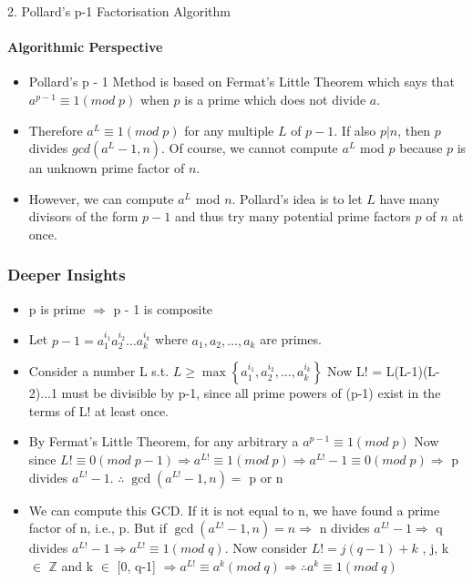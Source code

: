 \documentclass{beamer}
\begin{document}
\begin{frame}{2. Pollard’s p-1 Factorisation Algorithm}
\framesubtitle{Algorithmic Perspective}
\begin{itemize}
    \item Pollard's p - 1 Method is based on Fermat’s Little Theorem
    which says that $a^{p-1}\equiv 1\left( mod\;p\right) $ when $p$ is a prime which does not divide $a$.
    \item Therefore $a^{L}\equiv 1\left( mod\;p\right) $ for any multiple $L$ of $p-1$. If also $p | n$, then $p$ divides $gcd\left( a^{L}-1,n\right) $. Of course, we cannot compute $a^{L}$ mod $p$ because $p$ is an unknown prime factor of $n$.
    \item However, we can compute $a^{L}$ mod $n$. Pollard’s idea is to let $L$ have many divisors of the form $p − 1$ and thus try many potential prime factors $p$ of $n$ at once.
\end{itemize}
  
\end{frame}
\begin{frame}
\frametitle{Deeper Insights}
\begin{itemize}
    \item p is prime $\Rightarrow$ p - 1 is composite
    \item Let $p-1=a^{i_{1}}_{1}a^{i_{2}}_{2}\ldots a^{i_{k}}_{k}$ \quad \quad where $a_{1},a_{2},\ldots ,a_{k}$ are primes.
    \item Consider a number L s.t. $L\geq \max \left\{ a^{i_{1}}_{1}, a^{i_{2}}_{2}, \ldots , a^{i_{k}}_{k}\right\} $
    \break
    Now L! = L(L-1)(L-2)...1 must be divisible by p-1, since all prime powers of (p-1) exist in the terms of L! at least once.
    \item By Fermat's Little Theorem, for any arbitrary a \quad $a^{p-1}\equiv 1\left( mod \;p\right)$
    \break
    Now since $L!\equiv 0\left(mod\; p-1\right)  \Rightarrow   a^{L!}\equiv 1\left( mod \;p\right) \Rightarrow   a^{L!}-1\equiv 0\left( mod \;p\right) \Rightarrow $  p divides $a^{L!}-1$.\break
    $ \therefore \; \gcd \left( a^{L!}-1,n\right) =$ p or n
    \item We can compute this GCD. If it is not equal to n, we have found a prime factor of n, i.e., p. But if $\gcd \left( a^{L!}-1,n\right) = n  \Rightarrow$ n divides $a^{L!}-1 \Rightarrow$ q divides $a^{L!}-1 \Rightarrow a^{L!}\equiv 1\left( mod \;q\right)$.
    \break
    Now consider $L!=j\left( q-1\right) +k$ \quad , j, k $\in$ $\mathbb{Z}$  and k $\in$ [0, q-1]
    \break
    $\Rightarrow a^{L!}\equiv a^{k}\left( mod \;q\right) \Rightarrow \therefore a^{k}\equiv 1\left( mod \;q\right) $
\end{itemize}
\end{frame}
\end{document}
